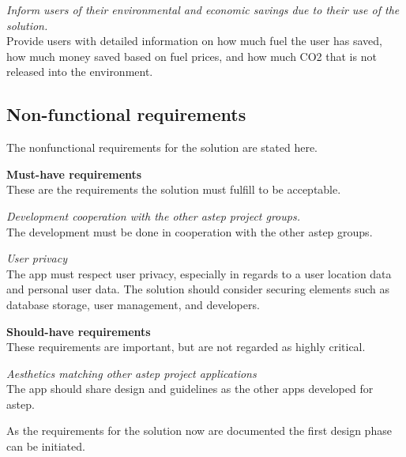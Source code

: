 \textit{Inform users of their environmental and economic savings due to their use of the solution.}\\
Provide users with detailed information on how much fuel the user has saved, how much money saved based on fuel prices, and how much CO2 that is not released into the environment. 

\subsection{Non-functional requirements}
The nonfunctional requirements for the solution are stated here.

\textbf{Must-have requirements}\\
These are the requirements the solution must fulfill to be acceptable.

\textit{Development cooperation with the other \gls{astep} project groups.}\\
The development must be done in cooperation with the other \gls{astep} groups.

\textit{User privacy}\\
The app must respect user privacy, especially in regards to a user location data and personal user data.
The solution should consider securing elements such as database storage, user management, and developers.

\textbf{Should-have requirements}\\
These requirements are important, but are not regarded as highly critical.

\textit{Aesthetics matching other \gls{astep} project applications}\\
The app should share design and guidelines as the other apps developed for \gls{astep}.

As the requirements for the solution now are documented the first design phase can be initiated. 